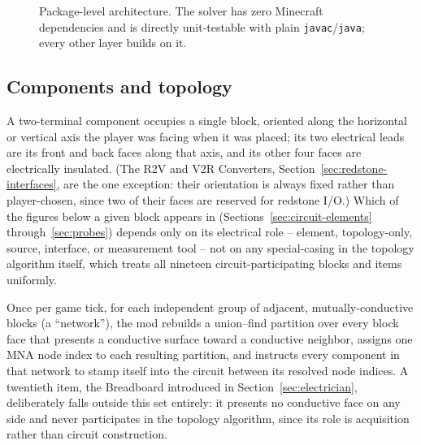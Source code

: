 \begin{figure}[htbp]
\caption{Package-level architecture. The solver has zero Minecraft dependencies and is
directly unit-testable with plain \texttt{javac}/\texttt{java}; every other layer builds on
it.}
\label{fig:architecture}
\end{figure}

\subsection{Components and topology}

A two-terminal component occupies a single block, oriented along the horizontal or vertical
axis the player was facing when it was placed; its two electrical leads are its front and
back faces along that axis, and its other four faces are electrically insulated. (The R2V and
V2R Converters, Section~\ref{sec:redstone-interfaces}, are the one exception: their orientation
is always fixed rather than player-chosen, since two of their faces are reserved for redstone
I/O.) Which of the figures below a given block appears in (Sections~\ref{sec:circuit-elements}
through~\ref{sec:probes}) depends only on its electrical role -- element, topology-only,
source, interface, or measurement tool -- not on any special-casing in the topology algorithm
itself, which treats all nineteen circuit-participating blocks and items uniformly.

Once per game tick, for each independent group of adjacent, mutually-conductive blocks
(a ``network''), the mod rebuilds a union--find partition over every block face that
presents a conductive surface toward a conductive neighbor, assigns one MNA node index to
each resulting partition, and instructs every component in that network to stamp itself
into the circuit between its resolved node indices. A twentieth item, the Breadboard
introduced in Section~\ref{sec:electrician}, deliberately falls outside this set entirely: it
presents no conductive face on any side and never participates in the topology algorithm, since
its role is acquisition rather than circuit construction.

